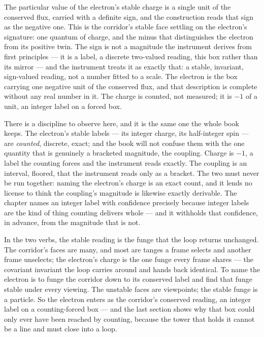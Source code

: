 The particular value of the electron's stable charge is a single unit of the conserved flux, carried with a definite sign,
and the construction reads that sign as the negative one. This is the corridor's stable face settling on the electron's
signature: one quantum of charge, and the minus that distinguishes the electron from its positive twin. The sign is not a
magnitude the instrument derives from first principles --- it is a label, a discrete two-valued reading, this box rather than
its mirror --- and the instrument treats it as exactly that: a stable, invariant, sign-valued reading, not a number fitted to
a scale. The electron is the box carrying one negative unit of the conserved flux, and that description is complete without
any real number in it. The charge is counted, not measured; it is $-1$ of a unit, an integer label on a forced box.

There is a discipline to observe here, and it is the same one the whole book keeps. The electron's stable labels --- its
integer charge, its half-integer spin --- are \emph{counted}, discrete, exact; and the book will not confuse them with the
one quantity that is genuinely a bracketed magnitude, the coupling. Charge is $-1$, a label the counting forces and the
instrument reads exactly. The coupling is an interval, floored, that the instrument reads only as a bracket. The two must
never be run together: naming the electron's charge is an exact count, and it lends no license to think the coupling's
magnitude is likewise exactly derivable. The chapter names an integer label with confidence precisely because integer labels
are the kind of thing counting delivers whole --- and it withholds that confidence, in advance, from the magnitude that is
not.

In the two verbs, the stable reading is the funge that the loop returns unchanged. The corridor's faces are many, and most
are tanges a frame selects and another frame unselects; the electron's charge is the one funge every frame shares --- the
covariant invariant the loop carries around and hands back identical. To name the electron is to funge the corridor down to
its conserved label and find that funge stable under every viewing. The unstable faces are viewpoints; the stable funge is a
particle. So the electron enters as the corridor's conserved reading, an integer label on a counting-forced box --- and the
last section shows why that box could only ever have been reached by counting, because the tower that holds it cannot be a
line and must close into a loop.

